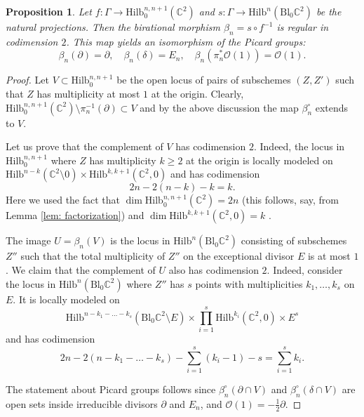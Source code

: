 \documentclass[12pt]{amsart}
\newcommand{\Hilb}{\mathrm{Hilb}}
\newcommand{\C}{\mathbb{C}}
\newcommand{\CO}{\mathcal{O}}
\newcommand{\Bl}{\mathrm{Bl}}
\numberwithin{equation}{section}
\newtheorem{proposition}[theorem]{Proposition}
\theoremstyle{definition}
\begin{document}
\begin{proposition}
  \label{prop: codim 2}
  Let \(f:\Gamma\to \Hilb_0^{n,n+1}(\C^2)\) and \(s:\Gamma\to \Hilb^n(\Bl_0\C^2)\) be the natural projections. Then
  the birational morphism \(\beta_n=s\circ f^{-1}\) is regular in codimension \(2\). This map yields an isomorphism
  of the Picard groups:
  \[ \beta_n(\partial)=\partial,\quad \beta_n(\delta)=E_n,\quad \beta_n(\pi_n^*\CO(1))=\CO(1).\]
\end{proposition}
\begin{proof}
Let $V\subset \Hilb^{n,n+1}_0$ be the open locus  of pairs of subschemes $(Z,Z')$ such that $Z$ has multiplicity at most $1$ at the origin.
Clearly, $\Hilb_0^{n,n+1}(\C^2)\setminus \pi_n^{-1}(\partial)\subset V$ and
by the above discussion the map $\beta_n^{\circ}$ extends to $V$.

Let us prove that the complement of $V$ has codimension $2$. Indeed, the locus in $\Hilb^{n,n+1}_0$ where $Z$ has multiplicity $k\ge 2$ at the origin is locally modeled on $\Hilb^{n-k}(\C^2\setminus 0)\times \Hilb^{k,k+1}(\C^2,0)$ and has codimension
$$
2n-2(n-k)-k=k.
$$
Here we used the fact that $\dim\Hilb^{n,n+1}_0(\C^2)=2n$ (this follows, say, from Lemma \ref{lem: factorization}) and $\dim \Hilb^{k,k+1}(\C^2,0)=k$ \cite{Cheah}.

The image $U=\beta_n(V)$ is the locus in $\Hilb^n(\Bl_0\C^2)$ consisting of subschemes $Z''$ such that the total multiplicity of $Z''$ on the exceptional divisor $E$ is at most $1$. We claim that the complement of $U$ also has codimension $2$. Indeed, consider the locus in  $\Hilb^n(\Bl_0\C^2)$ where $Z''$ has $s$ points with multiplicities $k_1,\ldots,k_s$ on $E$. It is locally modeled on 
$$
\Hilb^{n-k_1-\ldots-k_s}(\Bl_0\C^2\setminus E)\times \prod_{i=1}^{s}\Hilb^{k_i}(\C^2,0)\times E^s 
$$
and has codimension
$$
2n-2(n-k_1-\ldots-k_s)-\sum_{i=1}^{s}(k_i-1)-s=\sum_{i=1}^{s}k_i.
$$


   The  statement about Picard groups follows since \(\beta^{\circ}_n(\partial\cap V)\)    and \(\beta^{\circ}_n(\delta\cap V)\) are open sets inside irreducible
   divisors \(\partial\) and \(E_n\), and $\CO(1)=-\frac{1}{2}\partial$.
   \end{proof}
\end{document}
